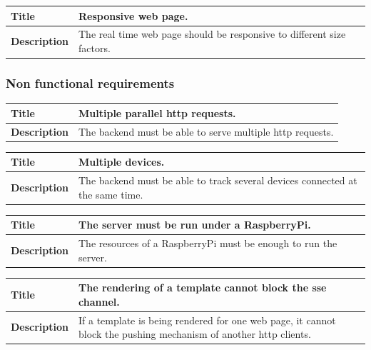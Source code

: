 \documentclass[12pt]{article}
\begin{document}
                \begin{tabularx}{\textwidth}{|l|X|}
                    \hline
                    \textbf{Title} & Responsive web page. \\
                    \hline
                    \textbf{Description} & The real time web page should be
                    responsive to different size factors. \\
                    \hline
                \end{tabularx}

            \subsubsection{Non functional requirements}
                \begin{tabularx}{\textwidth}{|l|X|}
                    \hline
                    \textbf{Title} & Multiple parallel http requests. \\
                    \hline
                    \textbf{Description} & The backend must be able to serve
                    multiple http requests. \\
                    \hline
                \end{tabularx}

                \begin{tabularx}{\textwidth}{|l|X|}
                    \hline
                    \textbf{Title} & Multiple devices. \\
                    \hline
                    \textbf{Description} & The backend must be able to track
                    several devices connected at the same time. \\
                    \hline
                \end{tabularx}

                \begin{tabularx}{\textwidth}{|l|X|}
                    \hline
                    \textbf{Title} & The server must be run under a RaspberryPi.\\
                    \hline
                    \textbf{Description} & The resources of a RaspberryPi must
                    be enough to run the server. \\
                    \hline
                \end{tabularx}

                \begin{tabularx}{\textwidth}{|l|X|}
                    \hline
                    \textbf{Title} & The rendering of a template cannot block
                    the sse channel. \\
                    \hline
                    \textbf{Description} & If a template is being rendered for
                    one web page, it cannot block the pushing mechanism of
                    another http clients. \\
                    \hline
                \end{tabularx}
\end{document}
